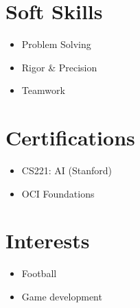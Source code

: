 \documentclass[a4paper,11pt]{article}
\begin{document}
\noindent
\begin{minipage}[t]{0.31\textwidth}
  \section{Soft Skills}
  \begin{itemize}[leftmargin=*, nosep, topsep=2pt]
    \item Problem Solving
    \item Rigor \& Precision
    \item Teamwork
  \end{itemize}
\end{minipage}
\hfill
\begin{minipage}[t]{0.35\textwidth}
  \section{Certifications}
  \begin{itemize}[leftmargin=*, nosep, topsep=2pt]
    \item CS221: AI (Stanford)
    \item OCI Foundations
  \end{itemize}
\end{minipage}
\hfill
\begin{minipage}[t]{0.28\textwidth}
  \section{Interests}
  \begin{itemize}[leftmargin=*, nosep, topsep=2pt]
    \item Football
    \item Game development
  \end{itemize}
\end{minipage}
\end{document}
